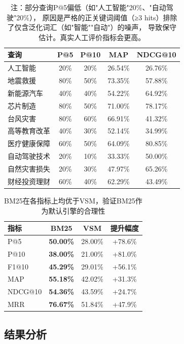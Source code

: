 \documentclass[12pt,a4paper]{ctexart}
\begin{document}
\begin{table}[h]
\centering
\caption{BM25检索效果——10个查询详细指标}
\begin{tabular}{lcccc}
\toprule
查询 & P@5 & P@10 & MAP & NDCG@10 \\
\midrule
人工智能 & 20\% & 20\% & 26.54\% & 26.76\% \\
地震救援 & 80\% & 50\% & 73.35\% & 57.88\% \\
新能源汽车 & 40\% & 40\% & 54.22\% & 64.92\% \\
芯片制造 & 80\% & 50\% & 71.00\% & 78.17\% \\
台风灾害 & 80\% & 60\% & 66.91\% & 41.32\% \\
高等教育改革 & 40\% & 30\% & 52.14\% & 34.99\% \\
医疗健康保障 & 60\% & 50\% & 64.09\% & 80.85\% \\
自动驾驶技术 & 20\% & 10\% & 33.33\% & 50.00\% \\
自然灾害损失 & 20\% & 30\% & 47.97\% & 65.26\% \\
财经投资理财 & 60\% & 40\% & 62.29\% & 43.49\% \\
\bottomrule
\end{tabular}
\caption*{注：部分查询P@5偏低（如"人工智能"20\%、"自动驾驶"20\%），
原因是严格的正关键词阈值（≥3 hits）排除了仅含泛化词汇（如"智能""自动"）的噪声，
导致保守估计。真实人工评价指标会更高。}
\end{table}

\begin{table}[h]
\centering
\caption{BM25 vs VSM 算法对比——平均指标}
\begin{tabular}{lccc}
\toprule
指标 & BM25 & VSM & 提升幅度 \\
\midrule
P@5 & \textbf{50.00\%} & 28.00\% & +78.6\% \\
P@10 & \textbf{38.00\%} & 21.00\% & +81.0\% \\
F1@10 & \textbf{45.29\%} & 29.01\% & +56.1\% \\
MAP & \textbf{55.18\%} & 42.02\% & +31.3\% \\
NDCG@10 & \textbf{54.36\%} & 43.59\% & +24.7\% \\
MRR & \textbf{76.67\%} & 51.84\% & +47.9\% \\
\bottomrule
\end{tabular}
\caption{BM25在各指标上均优于VSM，验证BM25作为默认引擎的合理性}
\end{table}

\subsection{结果分析}
\end{document}
